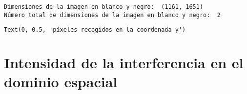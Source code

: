 \documentclass[11pt]{article}
\makeatletter
\newcommand{\boxspacing}{\kern\kvtcb@left@rule\kern\kvtcb@boxsep}
\newcommand{\prompt}[4]{
        {\ttfamily\llap{{\color{#2}[#3]:\hspace{3pt}#4}}\vspace{-\baselineskip}}
    }
\makeatother
\begin{document}
    \begin{Verbatim}[commandchars=\\\{\}]
Dimensiones de la imagen en blanco y negro:  (1161, 1651)
Número total de dimensiones de la imagen en blanco y negro:  2
    \end{Verbatim}

            \begin{tcolorbox}[breakable, size=fbox, boxrule=.5pt, pad at break*=1mm, opacityfill=0]
\prompt{Out}{outcolor}{5}{\boxspacing}
\begin{Verbatim}[commandchars=\\\{\}]
Text(0, 0.5, 'píxeles recogidos en la coordenada y')
\end{Verbatim}
\end{tcolorbox}
        
    \begin{center}
    \end{center}
 
    
    \hypertarget{intensidad-de-la-interferencia-en-el-dominio-espacial}{%
\section{Intensidad de la interferencia en el dominio
espacial}\label{intensidad-de-la-interferencia-en-el-dominio-espacial}}
\end{document}
